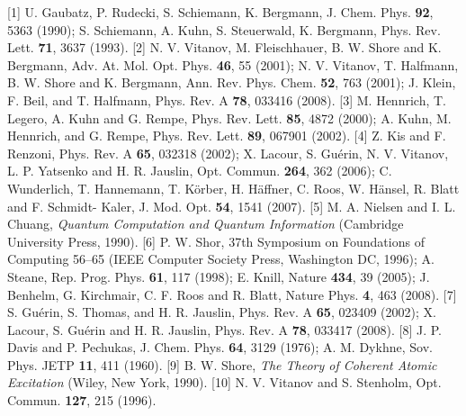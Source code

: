 [1] U. Gaubatz, P. Rudecki, S. Schiemann, K. Bergmann, J. Chem. Phys. \textbf{92}, 5363 (1990);
S. Schiemann, A. Kuhn, S. Steuerwald, K. Bergmann, Phys. Rev.
Lett. \textbf{71}, 3637 (1993).\newline
%
[2] N. V. Vitanov, M. Fleischhauer, B. W. Shore and K. Bergmann, Adv. At. Mol. Opt. Phys. \textbf{46}, 55 (2001);
N. V. Vitanov, T. Halfmann, B. W. Shore and K. Bergmann, Ann. Rev.
Phys. Chem. \textbf{52}, 763 (2001); J. Klein, F. Beil, and T.
Halfmann, Phys. Rev. A \textbf{78}, 033416 (2008).\newline
%
[3] M. Hennrich, T. Legero, A. Kuhn and G. Rempe, Phys. Rev. Lett.
\textbf{85}, 4872 (2000); A. Kuhn, M. Hennrich, and G. Rempe,
Phys. Rev. Lett. \textbf{89}, 067901 (2002).\newline
%
[4] Z. Kis and F. Renzoni, Phys. Rev. A \textbf{65}, 032318 (2002); X.
Lacour, S. Gu\'{e}rin, N. V. Vitanov, L. P. Yatsenko and H. R.
Jauslin, Opt. Commun. \textbf{264}, 362 (2006); C. Wunderlich, T.
Hannemann, T. K\"{o}rber, H. H\"{a}ffner, C. Roos, W. H\"{a}nsel,
R. Blatt and F. Schmidt- Kaler, J. Mod. Opt. \textbf{54}, 1541
(2007).\newline
%
[5] M. A. Nielsen and I. L. Chuang, \emph{Quantum Computation and Quantum Information} (Cambridge University Press, 1990).\newline
%
[6] P. W. Shor, 37th Symposium on Foundations of
Computing 56--65 (IEEE Computer Society Press, Washington DC,
1996); A. Steane, Rep. Prog. Phys. \textbf{61}, 117 (1998); E.
Knill, Nature \textbf{434}, 39 (2005); J. Benhelm, G. Kirchmair,
C. F. Roos and R. Blatt, Nature Phys. \textbf{4}, 463 (2008).\newline
%
[7] S. Gu\'{e}rin, S. Thomas, and H. R. Jauslin, Phys. Rev. A \textbf{65}, 023409 (2002);
 X. Lacour, S. Gu\'{e}rin and H. R. Jauslin, Phys. Rev. A \textbf{78}, 033417 (2008).\newline
%
[8] J. P. Davis and P. Pechukas, J. Chem. Phys. \textbf{64}, 3129 (1976);
 A. M. Dykhne, Sov. Phys. JETP \textbf{11}, 411 (1960).\newline
%
[9] B. W. Shore, \emph{The Theory of Coherent Atomic Excitation} (Wiley, New York, 1990).\newline
%
[10] N. V. Vitanov and S. Stenholm, Opt. Commun. \textbf{127}, 215 (1996).\newline

\vspace{\baselineskip}